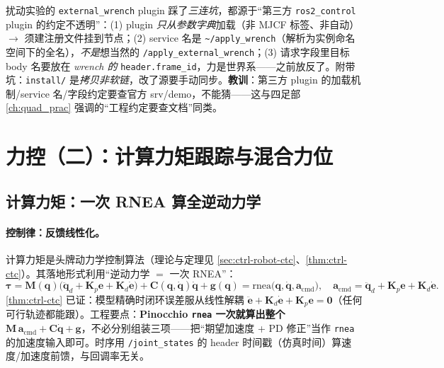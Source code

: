 \begin{pitfall}\label{pit:ap-plugin}
扰动实验的 \texttt{external\_wrench} plugin 踩了\emph{三连坑}，都源于“第三方 \texttt{ros2\_control} plugin 的约定不透明”：(1) plugin \emph{只从参数字典}加载（非 MJCF 标签、非自动）$\to$ 须建注册文件挂到节点；(2) service 名是 \texttt{\textasciitilde/apply\_wrench}（解析为实例命名空间下的全名），\emph{不是}想当然的 \texttt{/apply\_external\_wrench}；(3) 请求字段里目标 body 名要放在 \emph{wrench 的} \texttt{header.frame\_id}，力是世界系——之前放反了。附带坑：\texttt{install/} 是\emph{拷贝非软链}，改了源要手动同步。\textbf{教训}：第三方 plugin 的加载机制/service 名/字段约定要查官方 srv/demo，不能猜——这与四足部 \cref{ch:quad_prac} 强调的“工程约定要查文档”同类。
\end{pitfall}

\section{力控（二）：计算力矩跟踪与混合力位}
\label{sec:ap-ctc}

\subsection{计算力矩：一次 RNEA 算全逆动力学}
\label{sec:ap-computed-torque}

\paragraph{控制律：反馈线性化。}
计算力矩是头牌动力学控制算法（理论与定理见 \cref{sec:ctrl-robot-ctc}、\cref{thm:ctrl-ctc}）。其落地形式利用“逆动力学 $=$ 一次 RNEA”：
\begin{equation}
  \boxed{\boldsymbol{\tau}=\mathbf{M}(\mathbf{q})\big(\ddot{\mathbf{q}}_d+\mathbf{K}_p\mathbf{e}+\mathbf{K}_d\dot{\mathbf{e}}\big)+\mathbf{C}(\mathbf{q},\dot{\mathbf{q}})\dot{\mathbf{q}}+\mathbf{g}(\mathbf{q})=\mathrm{rnea}\big(\mathbf{q},\dot{\mathbf{q}},\mathbf{a}_{\mathrm{cmd}}\big),}
  \quad \mathbf{a}_{\mathrm{cmd}}=\ddot{\mathbf{q}}_d+\mathbf{K}_p\mathbf{e}+\mathbf{K}_d\dot{\mathbf{e}}.
  \label{eq:ap-ctc}
\end{equation}
\cref{thm:ctrl-ctc} 已证：模型精确时闭环误差服从线性解耦 $\ddot{\mathbf{e}}+\mathbf{K}_d\dot{\mathbf{e}}+\mathbf{K}_p\mathbf{e}=\mathbf{0}$（任何可行轨迹都能跟）。工程要点：\textbf{Pinocchio \texttt{rnea} 一次就算出整个 $\mathbf{M}\,\mathbf{a}_{\mathrm{cmd}}+\mathbf{C}\dot{\mathbf{q}}+\mathbf{g}$}，不必分别组装三项——把“期望加速度 + PD 修正”当作 \texttt{rnea} 的加速度输入即可。时序用 \texttt{/joint\_states} 的 header 时间戳（仿真时间）算速度/加速度前馈，与回调率无关。

